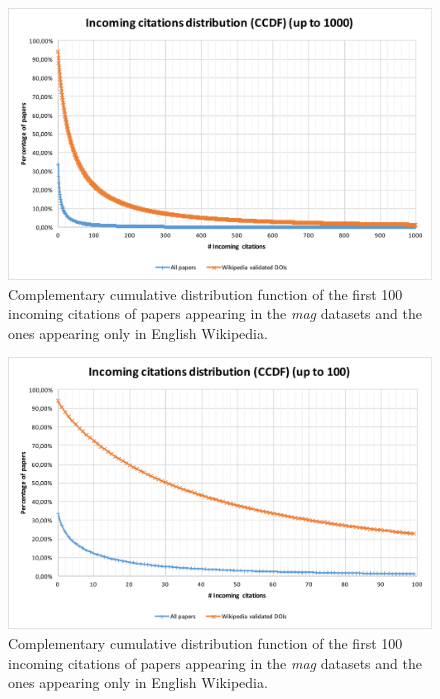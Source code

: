 \begin{figure}
\centering
\includegraphics[keepaspectratio=true, width=\textwidth]{assets/incoming_cits_ccdf_1000}
\caption{Complementary cumulative distribution function of the first 100 incoming citations of papers appearing in the \emph{mag} datasets and the ones appearing only in English Wikipedia.}
\label{fig:incoming_citations_ccdf_1000}
\end{figure}

\begin{figure}
\centering
\includegraphics[keepaspectratio=true, width=\textwidth]{assets/incoming_cits_ccdf_100}
\caption{Complementary cumulative distribution function of the first 100 incoming citations of papers appearing in the \emph{mag} datasets and the ones appearing only in English Wikipedia.}
\label{fig:incoming_citations_ccdf_100}
\end{figure}



